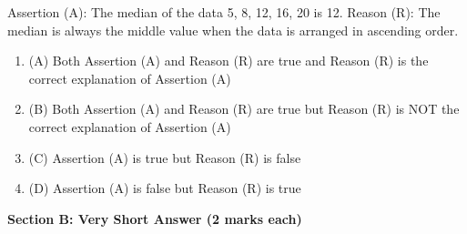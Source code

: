 \documentclass[12pt,a4paper]{exam}
\begin{document}
\begin{questions}
\question[1] Assertion (A): The median of the data 5, 8, 12, 16, 20 is 12. Reason (R): The median is always the middle value when the data is arranged in ascending order.
\begin{enumerate}[label=(\Alph*)]
  \item (A) Both Assertion (A) and Reason (R) are true and Reason (R) is the correct explanation of Assertion (A)
  \item (B) Both Assertion (A) and Reason (R) are true but Reason (R) is NOT the correct explanation of Assertion (A)
  \item (C) Assertion (A) is true but Reason (R) is false
  \item (D) Assertion (A) is false but Reason (R) is true
\end{enumerate}
\vspace{0.15cm}

\end{questions}
\bigskip
\noindent\textbf{\large Section B: Very Short Answer (2 marks each)}
\end{document}
